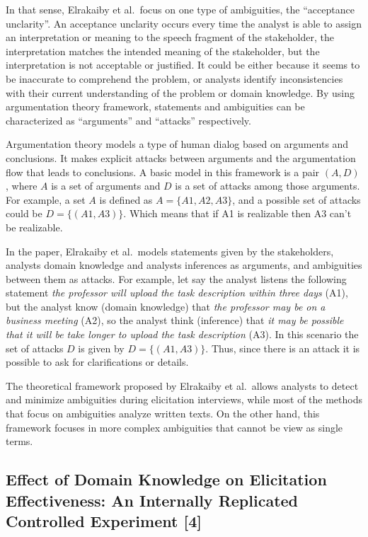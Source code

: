 \documentclass[]{llncs}
\begin{document}
In that sense, Elrakaiby et al.~focus on one type of ambiguities, the
``acceptance unclarity''. An acceptance unclarity occurs every time the
analyst is able to assign an interpretation or meaning to the speech
fragment of the stakeholder, the interpretation matches the intended
meaning of the stakeholder, but the interpretation is not acceptable or
justified. It could be either because it seems to be inaccurate to
comprehend the problem, or analysts identify inconsistencies with their
current understanding of the problem or domain knowledge. By using
argumentation theory framework, statements and ambiguities can be
characterized as ``arguments'' and ``attacks'' respectively.

Argumentation theory models a type of human dialog based on arguments
and conclusions. It makes explicit attacks between arguments and the
argumentation flow that leads to conclusions. A basic model in this
framework is a pair \((A,D)\), where \(A\) is a set of arguments and
\(D\) is a set of attacks among those arguments. For example, a set
\(A\) is defined as \(A = \{A1,A2,A3\}\), and a possible set of attacks
could be \(D = \{(A1,A3)\}\). Which means that if A1 is realizable then
A3 can't be realizable.

In the paper, Elrakaiby et al.~models statements given by the
stakeholders, analysts domain knowledge and analysts inferences as
arguments, and ambiguities between them as attacks. For example, let say
the analyst listens the following statement \emph{the professor will
upload the task description within three days} (A1), but the analyst
know (domain knowledge) that \emph{the professor may be on a business
meeting} (A2), so the analyst think (inference) that \emph{it may be
possible that it will be take longer to upload the task description}
(A3). In this scenario the set of attacks \(D\) is given by
\(D = \{(A1,A3)\}\). Thus, since there is an attack it is possible to
ask for clarifications or details.

The theoretical framework proposed by Elrakaiby et al.~allows analysts
to detect and minimize ambiguities during elicitation interviews, while
most of the methods that focus on ambiguities analyze written texts. On
the other hand, this framework focuses in more complex ambiguities that
cannot be view as single terms.

\hypertarget{effect-of-domain-knowledge-on-elicitation-effectiveness-an-internally-replicated-controlled-experiment-aranda2016effect}{%
\subsection{Effect of Domain Knowledge on Elicitation Effectiveness: An
Internally Replicated Controlled Experiment
{[}4{]}}\label{effect-of-domain-knowledge-on-elicitation-effectiveness-an-internally-replicated-controlled-experiment-aranda2016effect}}
\end{document}
